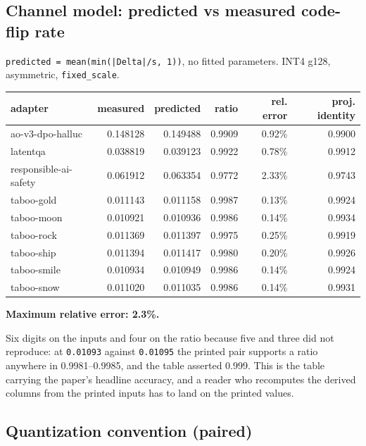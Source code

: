 \subsection{Channel model: predicted vs measured code-flip rate}

\texttt{predicted = mean(min(|Delta|/\allowbreak{}s, 1))}, no fitted parameters. INT4 g128, asymmetric, \texttt{fixed\_\allowbreak{}scale}.

\begin{table}[t]
\centering\footnotesize
\begin{tabularx}{\textwidth}{>{\hsize=1.000\hsize\raggedright\arraybackslash}Xrrrrr}
\toprule
adapter & measured & predicted & ratio & rel. error & proj. identity \\
\midrule
ao-v3-dpo-halluc & 0.148128 & 0.149488 & 0.9909 & 0.92\% & 0.9900 \\
latentqa & 0.038819 & 0.039123 & 0.9922 & 0.78\% & 0.9912 \\
responsible-ai-safety & 0.061912 & 0.063354 & 0.9772 & 2.33\% & 0.9743 \\
taboo-gold & 0.011143 & 0.011158 & 0.9987 & 0.13\% & 0.9924 \\
taboo-moon & 0.010921 & 0.010936 & 0.9986 & 0.14\% & 0.9934 \\
taboo-rock & 0.011369 & 0.011397 & 0.9975 & 0.25\% & 0.9919 \\
taboo-ship & 0.011394 & 0.011417 & 0.9980 & 0.20\% & 0.9926 \\
taboo-smile & 0.010934 & 0.010949 & 0.9986 & 0.14\% & 0.9924 \\
taboo-snow & 0.011020 & 0.011035 & 0.9986 & 0.14\% & 0.9931 \\
\bottomrule
\end{tabularx}
\end{table}

\textbf{Maximum relative error: 2.3\%.}

Six digits on the inputs and four on the ratio because five and three did not reproduce: at \texttt{0.\allowbreak{}01093} against \texttt{0.\allowbreak{}01095} the printed pair supports a ratio anywhere in 0.9981--0.9985, and the table asserted 0.999. This is the table carrying the paper's headline accuracy, and a reader who recomputes the derived columns from the printed inputs has to land on the printed values.

\subsection{Quantization convention (paired)}


